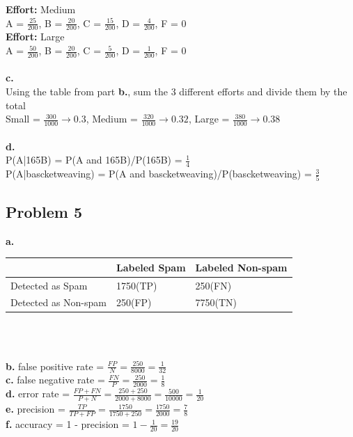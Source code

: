 \documentclass[letter]{article}
\theoremstyle{case}
\begin{document}
\textbf{Effort: } Medium \\
A = $\frac{25}{200}$, B = $\frac{20}{200}$, C = $\frac{15}{200}$, D = $\frac{4}{200}$, F = 0 \\
\textbf{Effort: } Large \\
A = $\frac{50}{200}$, B = $\frac{20}{200}$, C = $\frac{5}{200}$, D = $\frac{1}{200}$, F = 0 \\\\
\textbf{c. }\\
Using the table from part \textbf{b.}, sum the 3 different efforts and divide them by the total\\
Small = $\frac{300}{1000} \rightarrow 0.3$, Medium = $\frac{320}{1000} \rightarrow 0.32$, Large = $\frac{380}{1000} \rightarrow 0.38 $ \\\\
\textbf{d. } \\
P(A|165B) = P(A and 165B)/P(165B) = $\frac{1}{4}$ \\
P(A|bascketweaving) = P(A and bascketweaving)/P(bascketweaving) = $\frac{3}{5}$ \\

\subsection*{Problem 5}
\textbf{a. } \\
\begin{table}[h!]
\begin{tabular}{|l|l|l|}
\hline
                     & Labeled Spam & Labeled Non-spam \\ \hline
Detected as Spam     & 1750(TP)     & 250(FN)          \\ \hline
Detected as Non-spam & 250(FP)      & 7750(TN)         \\ \hline
\end{tabular}\\
\end{table}\\
\textbf{b. } false positive rate = $\frac{FP}{N} = \frac{250}{8000} = \frac{1}{32}$\\
\textbf{c. } false negative rate = $\frac{FN}{P} = \frac{250}{2000} = \frac{1}{8}$\\
\textbf{d. } error rate = $\frac{FP + FN}{P + N} = \frac{250 + 250}{2000 + 8000} = \frac{500}{10000} = \frac{1}{20}$\\
\textbf{e. } precision = $\frac{TP}{TP+FP} = \frac{1750}{1750 + 250} = \frac{1750}{2000} = \frac{7}{8}$\\
\textbf{f. } accuracy = 1 - precision = $1 - \frac{1}{20} = \frac{19}{20}$\\
\newpage
\end{document}
